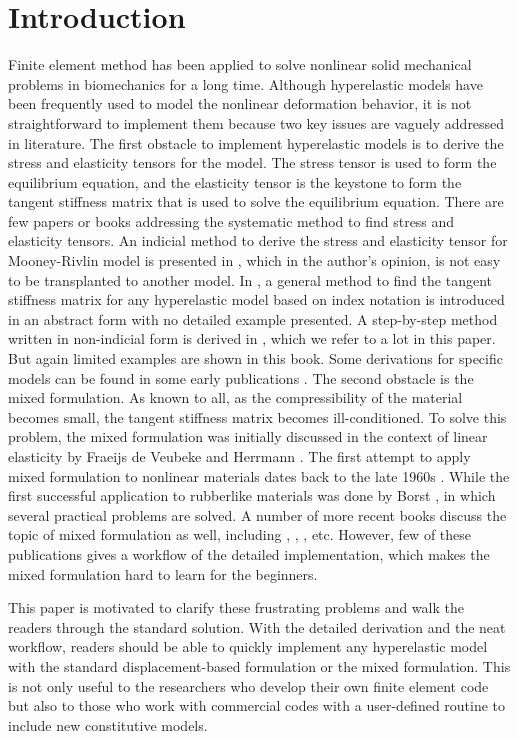 \section{Introduction}
Finite element method has been applied to solve nonlinear solid mechanical problems in biomechanics for a long time. Although hyperelastic models have been frequently used to model the nonlinear deformation behavior, it is not straightforward to implement them because two key issues are vaguely addressed in literature. The first obstacle to implement hyperelastic models is to derive the stress and elasticity tensors for the model. The stress tensor is used to form the equilibrium equation, and the elasticity tensor is the keystone to form the tangent stiffness matrix that is used to solve the equilibrium equation. There are few papers or books addressing the systematic method to find stress and elasticity tensors. An indicial method to derive the stress and elasticity tensor for Mooney-Rivlin model is presented in \cite{Bower}, which in the author's opinion, is not easy to be transplanted to another model. In \cite{Belytschko}, a general method to find the tangent stiffness matrix for any hyperelastic model based on index notation is introduced in an abstract form with no detailed example presented. A step-by-step method written in non-indicial form is derived in \cite{Holzapfel}, which we refer to a lot in this paper. But again limited examples are shown in this book. Some derivations for specific models can be found in some early publications \cite{Weiss, Nicholson}. The second obstacle is the mixed formulation. As known to all, as the compressibility of the material becomes small, the tangent stiffness matrix becomes ill-conditioned. To solve this problem, the mixed formulation was initially discussed in the context of linear elasticity by Fraeijs de Veubeke \cite{Veubeke} and Herrmann \cite{Herrmann}. The first attempt to apply mixed formulation to nonlinear materials dates back to the late 1960s \cite{Oden}. While the first successful application to rubberlike materials was done by Borst \cite{Borst}, in which several practical problems are solved. A number of more recent books discuss the topic of mixed formulation as well, including \cite{Bathe}, \cite{Holzapfel}, \cite{Zienkiewicz}, etc. However, few of these publications gives a workflow of the detailed implementation, which makes the mixed formulation hard to learn for the beginners. 

This paper is motivated to clarify these frustrating problems and walk the readers through the standard solution. With the detailed derivation and the neat workflow, readers should be able to quickly implement any hyperelastic model with the standard displacement-based formulation or the mixed formulation. This is not only useful to the researchers who develop their own finite element code but also to those who work with commercial codes with a user-defined routine to include new constitutive models.

